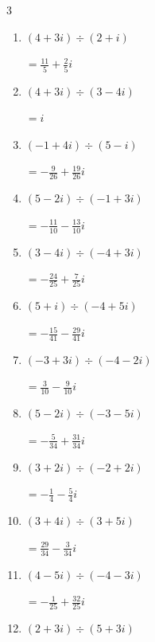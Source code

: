 \begin{multicols}{3}
\begin{enumerate}
\columnbreak %

\resetques

  \item $\displaystyle (4+3i)\div(2+i)$

        $\displaystyle =\frac{11}{5}+\frac{2}{5}i$

  \item $\displaystyle (4+3i)\div(3-4i)$

        $\displaystyle =i$

  \item $\displaystyle (-1+4i)\div(5-i)$

        $\displaystyle =-\frac{9}{26}+\frac{19}{26}i$

  \item $\displaystyle (5-2i)\div(-1+3i)$

        $\displaystyle =-\frac{11}{10}-\frac{13}{10}i$

  \item $\displaystyle (3-4i)\div(-4+3i)$

        $\displaystyle =-\frac{24}{25}+\frac{7}{25}i$

  \item $\displaystyle (5+i)\div(-4+5i)$

        $\displaystyle =-\frac{15}{41}-\frac{29}{41}i$

  \item $\displaystyle (-3+3i)\div(-4-2i)$

        $\displaystyle =\frac{3}{10}-\frac{9}{10}i$

  \item $\displaystyle (5-2i)\div(-3-5i)$

        $\displaystyle =-\frac{5}{34}+\frac{31}{34}i$

  \item $\displaystyle (3+2i)\div(-2+2i)$

        $\displaystyle =-\frac{1}{4}-\frac{5}{4}i$

  \item $\displaystyle (3+4i)\div(3+5i)$

        $\displaystyle =\frac{29}{34}-\frac{3}{34}i$

\columnbreak %

  \item $\displaystyle (4-5i)\div(-4-3i)$

        $\displaystyle =-\frac{1}{25}+\frac{32}{25}i$

  \item $\displaystyle (2+3i)\div(5+3i)$


\end{enumerate}
\end{multicols}
